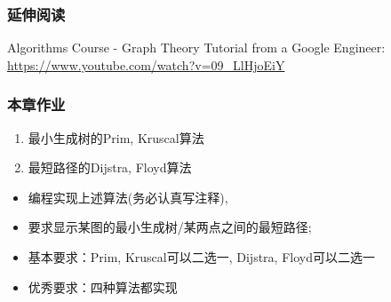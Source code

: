 \begin{frame}[fragile]
	\frametitle{延伸阅读}
    
    Algorithms Course - Graph Theory Tutorial from a Google Engineer: 
    \url{https://www.youtube.com/watch?v=09_LlHjoEiY}


\end{frame}

\begin{frame}[fragile]
  \frametitle{本章作业}
  \begin{enumerate}
  \item 最小生成树的Prim, Kruscal算法
  \item 最短路径的Dijstra, Floyd算法
  \end{enumerate}

  \begin{itemize}
  \item 编程实现上述算法(务必认真写注释),
  \item 要求显示某图的最小生成树/某两点之间的最短路径;
  \item 基本要求：Prim, Kruscal可以二选一, Dijstra, Floyd可以二选一
  \item 优秀要求：四种算法都实现
  \end{itemize}
\end{frame}

